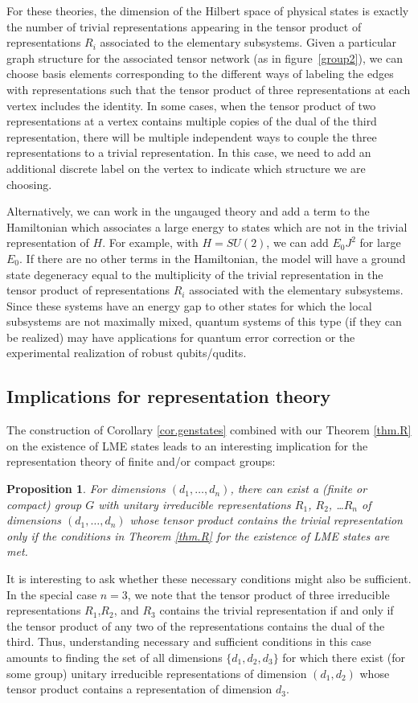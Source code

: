 \documentclass[12pt]{article}
\newtheorem{proposition}[theorem]{Proposition}
\theoremstyle{definition}
\begin{document}
For these theories, the dimension of the Hilbert space of physical states is exactly the number of trivial representations appearing in the tensor product of representations $R_i$ associated to the elementary subsystems. Given a particular graph structure for the associated tensor network (as in figure~\ref{group2}), we can choose basis elements corresponding to the different ways of labeling the edges with representations such that the tensor product of three representations at each vertex includes the identity. In some cases, when the tensor product of two representations at a vertex contains multiple copies of the dual of the third representation, there will be multiple independent ways to couple the three representations to a trivial representation. In this case, we need to add an additional discrete label on the vertex to indicate which structure we are choosing.

Alternatively, we can work in the ungauged theory and add a term to the Hamiltonian which associates a large energy to states which are not in the trivial representation of $H$. For example, with $H = SU(2)$, we can add $E_0 J^2$ for large $E_0$. If there are no other terms in the Hamiltonian, the model will have a ground state degeneracy equal to the multiplicity of the trivial representation in the tensor product of representations $R_i$ associated with the elementary subsystems. Since these systems  have an energy gap to other states for which the local subsystems are not maximally mixed, quantum systems of this type (if they can be realized) may have applications for quantum error correction or the experimental realization of robust qubits/qudits.

\subsection{Implications for representation theory}

The construction of Corollary \ref{cor.genstates} combined with our Theorem \ref{thm.R} on the existence of LME states leads to an interesting implication for the representation theory of finite and/or compact groups:
\begin{proposition}
For dimensions $(d_1, \dots, d_n)$, there can exist a (finite or compact) group $G$ with unitary irreducible representations $R_1$, $R_2$, \dots $R_n$  of dimensions $(d_1, \dots, d_n)$ whose tensor product contains the trivial representation only if the conditions in Theorem \ref{thm.R} for the existence of LME states are met.
\end{proposition}
It is interesting to ask whether these necessary conditions might also be sufficient. In the special case $n=3$, we note that the tensor product of three irreducible representations $R_1$,$R_2$, and $R_3$ contains the trivial representation if and only if the tensor product of any two of the representations contains the dual of the third. Thus, understanding necessary and sufficient conditions in this case amounts to finding the set of all dimensions $\{d_1, d_2, d_3\}$ for which there exist (for some group) unitary irreducible representations  of dimension $(d_1,d_2)$ whose tensor product contains a representation of dimension $d_3$.
\end{document}
